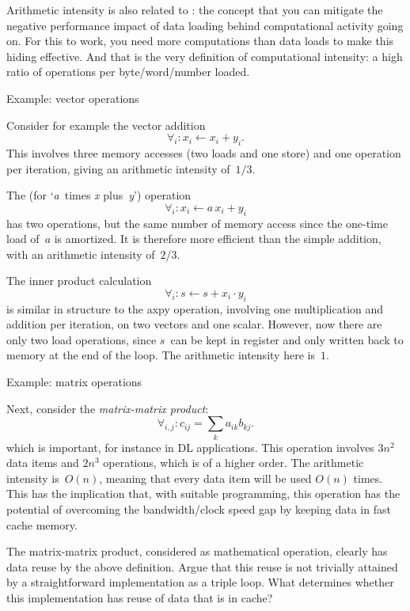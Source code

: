  Arithmetic intensity is also related to :
  the concept that you can mitigate the negative performance impact
  of data loading
  behind computational activity going on.
  For this to work, you need more computations than data loads to make
  this hiding effective. And that is the very definition of
  computational intensity: a high ratio of operations per
  byte/word/number loaded.

 {Example: vector operations}

Consider for example the vector addition 
\[ \forall_i\colon x_i\leftarrow x_i+y_i.
\]
This involves three memory accesses (two loads and one store) 
and one operation per iteration,
giving an arithmetic intensity of~$1/3$.

The 
 (for
`\emph{a}~times \emph{x} plus~\emph{y}') operation 
\[ \forall_i\colon x_i\leftarrow a\,x_i+ y_i
\]
has
two operations, but the same number of memory access since the
one-time load of~$a$ is amortized. It is therefore more efficient
than the simple addition, with an arithmetic intensity of~$2/3$.

The inner product calculation 
\[ \forall_i\colon s\leftarrow s+x_i\cdot y_i
\]
is similar in structure to the axpy operation, involving one
multiplication and addition per iteration, on two vectors and one
scalar. However, now there are only two load operations, since $s$~can
be kept in register and only written back to memory at the end of the
loop. The arithmetic intensity here is~$1$.

 {Example: matrix operations}
\label{sec:gemm}
\label{sec:mmp-example}

Next, consider the \emph{matrix-matrix product}:
\[ \forall_{i,j}\colon c_{ij} = \sum_k a_{ik}b_{kj}. \]
which is important, for instance in \ac{DL} applications.
This operation involves
$3n^2$ data items and $2n^3$ operations, which is of a
higher order. The arithmetic intensity is~$O(n)$, meaning that every data item
will be used $O(n)$ times.  This has the implication that, with
suitable programming, this operation has the potential of overcoming
the bandwidth/clock speed gap by keeping data in fast cache memory.

\begin{exercise}
  The matrix-matrix product, considered as mathematical operation, clearly
  has data reuse by the above definition. Argue that this reuse is not
  trivially attained by a straightforward implementation as a triple loop.
  What determines whether this implementation has reuse of data that is in cache?
\end{exercise}

